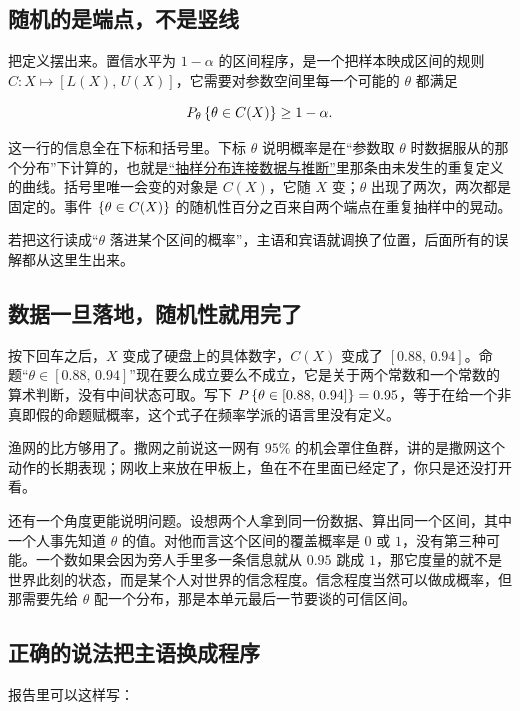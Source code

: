 \subsection{随机的是端点，不是竖线}

把定义摆出来。置信水平为 \(1-\alpha\) 的区间程序，是一个把样本映成区间的规则 \(C\colon X\mapsto[L(X),\,U(X)]\)，它需要对参数空间里每一个可能的 \(\theta\) 都满足

\[
P_\theta\left\{\theta\in C(X)\right\}\ge 1-\alpha .
\]

这一行的信息全在下标和括号里。下标 \(\theta\) 说明概率是在``参数取 \(\theta\) 时数据服从的那个分布''下计算的，也就是\hyperref[sec:11-Mathematical-Statistics/01-Statistical-Models/03]{``抽样分布连接数据与推断''}里那条由未发生的重复定义的曲线。括号里唯一会变的对象是 \(C(X)\)，它随 \(X\) 变；\(\theta\) 出现了两次，两次都是固定的。事件 \(\left\{\theta\in C(X)\right\}\) 的随机性百分之百来自两个端点在重复抽样中的晃动。

若把这行读成``\(\theta\) 落进某个区间的概率''，主语和宾语就调换了位置，后面所有的误解都从这里生出来。

\subsection{数据一旦落地，随机性就用完了}

按下回车之后，\(X\) 变成了硬盘上的具体数字，\(C(X)\) 变成了 \([0.88,\,0.94]\)。命题``\(\theta\in[0.88,\,0.94]\)''现在要么成立要么不成立，它是关于两个常数和一个常数的算术判断，没有中间状态可取。写下 \(P\left\{\theta\in[0.88,\,0.94]\right\}=0.95\)，等于在给一个非真即假的命题赋概率，这个式子在频率学派的语言里没有定义。

渔网的比方够用了。撒网之前说这一网有 \(95\%\) 的机会罩住鱼群，讲的是撒网这个动作的长期表现；网收上来放在甲板上，鱼在不在里面已经定了，你只是还没打开看。

还有一个角度更能说明问题。设想两个人拿到同一份数据、算出同一个区间，其中一个人事先知道 \(\theta\) 的值。对他而言这个区间的覆盖概率是 \(0\) 或 \(1\)，没有第三种可能。一个数如果会因为旁人手里多一条信息就从 \(0.95\) 跳成 \(1\)，那它度量的就不是世界此刻的状态，而是某个人对世界的信念程度。信念程度当然可以做成概率，但那需要先给 \(\theta\) 配一个分布，那是本单元最后一节要谈的可信区间。

\subsection{正确的说法把主语换成程序}

报告里可以这样写：

